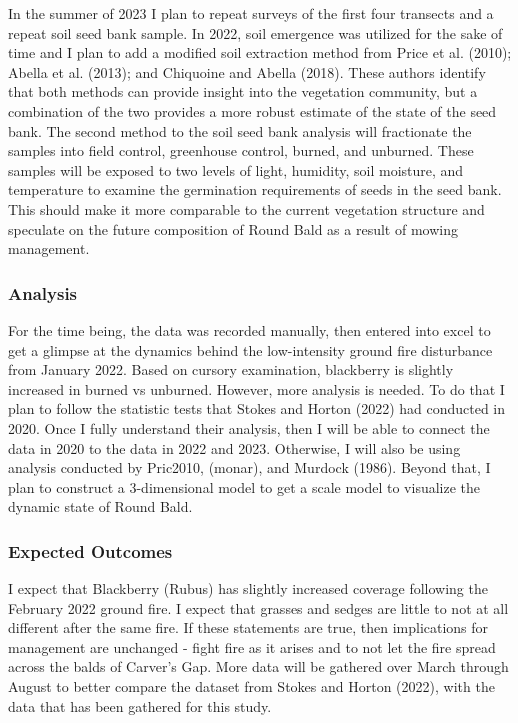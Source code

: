 \documentclass[
]{article}
\begin{document}
In the summer of 2023 I plan to repeat surveys of the first four transects and a repeat soil seed bank sample. In 2022, soil emergence was utilized for the sake of time and I plan to add a modified soil extraction method from Price et al. (2010); Abella et al. (2013); and Chiquoine and Abella (2018). These authors identify that both methods can provide insight into the vegetation community, but a combination of the two provides a more robust estimate of the state of the seed bank. The second method to the soil seed bank analysis will fractionate the samples into field control, greenhouse control, burned, and unburned. These samples will be exposed to two levels of light, humidity, soil moisture, and temperature to examine the germination requirements of seeds in the seed bank. This should make it more comparable to the current vegetation structure and speculate on the future composition of Round Bald as a result of mowing management.

\hypertarget{analysis}{%
\subsubsection{Analysis}\label{analysis}}

For the time being, the data was recorded manually, then entered into excel to get a glimpse at the dynamics behind the low-intensity ground fire disturbance from January 2022. Based on cursory examination, blackberry is slightly increased in burned vs unburned. However, more analysis is needed. To do that I plan to follow the statistic tests that Stokes and Horton (2022) had conducted in 2020. Once I fully understand their analysis, then I will be able to connect the data in 2020 to the data in 2022 and 2023. Otherwise, I will also be using analysis conducted by Pric2010, (monar), and Murdock (1986). Beyond that, I plan to construct a 3-dimensional model to get a scale model to visualize the dynamic state of Round Bald.

\hypertarget{expected-outcomes}{%
\subsubsection{Expected Outcomes}\label{expected-outcomes}}

I expect that Blackberry (Rubus) has slightly increased coverage following the February 2022 ground fire. I expect that grasses and sedges are little to not at all different after the same fire. If these statements are true, then implications for management are unchanged - fight fire as it arises and to not let the fire spread across the balds of Carver's Gap. More data will be gathered over March through August to better compare the dataset from Stokes and Horton (2022), with the data that has been gathered for this study.
\end{document}
